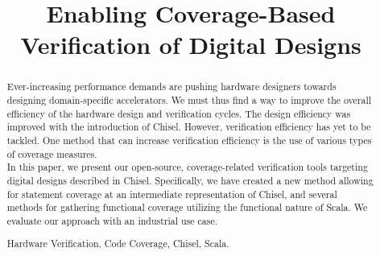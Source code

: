 \documentclass[conference]{IEEEtran}
\newcommand{\martin}[1]{{\color{blue} Martin: #1}}
\begin{document}
%
\title{Enabling Coverage-Based Verification of Digital Designs}
\author{
}
%
%
%

%
%
\maketitle              %
%

\begin{abstract}
Ever-increasing performance demands are pushing hardware designers towards designing domain-specific accelerators. We must thus find a way to improve the overall efficiency of the hardware design and verification cycles. The design efficiency was improved with the introduction of Chisel. However, verification efficiency has yet to be tackled.
One method that can increase verification efficiency is the use of various types of coverage measures.\\
In this paper, we present our open-source, coverage-related verification tools targeting digital designs described in Chisel. %
Specifically, we have created a new method allowing for statement coverage at an intermediate representation of Chisel, %
and several methods for gathering functional coverage utilizing the functional nature of Scala. We evaluate our approach with an industrial use case.

\begin{IEEEkeywords}
Hardware Verification, Code Coverage, Chisel, Scala.
\end{IEEEkeywords}

\end{abstract}
\end{document}
